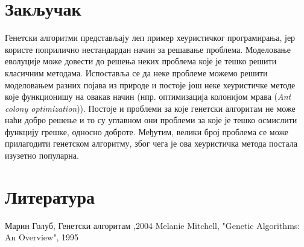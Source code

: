 \documentclass{article}
\begin{document}
\section{Закључак}
Генетски алгоритми представљају леп пример хеуристичког програмирања, јер користе поприлично
нестандардан начин за решавање проблема. Моделовање еволуције може довести до решења неких проблема 
које је тешко решити класичним методама. Испоставља се да неке проблеме можемо решити моделовањем 
разних појава из природе и постоје још неке хеуристичке методе које функционишу на овакав начин
(нпр. оптимизација колонијом мрава (\textit{Ant colony optimization})). Постоје и проблеми за које
генетски алгоритам не може наћи добро решење и то су углавном они проблеми за које је тешко осмислити 
функцију грешке, односно доброте. Међутим, велики број проблема се може прилагодити генетском
алгоритму, због чега је ова хеуристичка метода постала изузетно популарна.


\section{Литература}
\noindent[1] Марин Голуб, Генетски алгоритам ,2004 \newline
[2] Melanie Mitchell, "Genetic Algorithms: An Overview", 1995 \newline
[3] 
\end{document}
